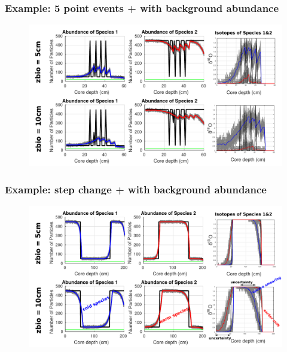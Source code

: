 \documentclass{beamer}
\begin{document}
\begin{frame}
\frametitle{Example: 5 point events + with background abundance}
\begin{figure}[hbtp]
\hspace*{-0.8cm}\includegraphics[width=1.1\textwidth]{figures/5point_event_5+10cm_background.pdf}%
\end{figure}
\end{frame}

\begin{frame}
\frametitle{Example: step change + with background abundance}
\begin{figure}[hbtp]
\hspace*{-0.8cm}\includegraphics[width=1.1\textwidth]{figures/stepchange2_5+10cm_background.pdf}%
\end{figure}
\end{frame}
\end{document}
